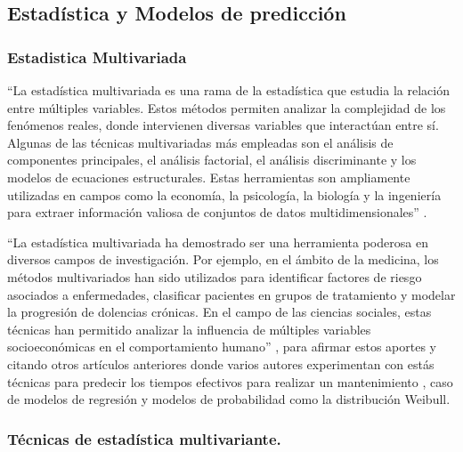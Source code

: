 \documentclass[
  11pt,
  bookmarksnumbered]{article}
\begin{document}
\newpage

\hypertarget{estaduxedstica-y-modelos-de-predicciuxf3n}{%
\subsection{Estadística y Modelos de predicción}\label{estaduxedstica-y-modelos-de-predicciuxf3n}}

\hypertarget{estadistica-multivariada}{%
\subsubsection{Estadistica Multivariada}\label{estadistica-multivariada}}

``La estadística multivariada es una rama de la estadística que estudia la relación entre múltiples variables. Estos métodos permiten analizar la complejidad de los fenómenos reales, donde intervienen diversas variables que interactúan entre sí. Algunas de las técnicas multivariadas más empleadas son el análisis de componentes principales, el análisis factorial, el análisis discriminante y los modelos de ecuaciones estructurales. Estas herramientas son ampliamente utilizadas en campos como la economía, la psicología, la biología y la ingeniería para extraer información valiosa de conjuntos de datos multidimensionales'' \textcite{hair}.

``La estadística multivariada ha demostrado ser una herramienta poderosa en diversos campos de investigación. Por ejemplo, en el ámbito de la medicina, los métodos multivariados han sido utilizados para identificar factores de riesgo asociados a enfermedades, clasificar pacientes en grupos de tratamiento y modelar la progresión de dolencias crónicas. En el campo de las ciencias sociales, estas técnicas han permitido analizar la influencia de múltiples variables socioeconómicas en el comportamiento humano'' \textcite{Tabachnick2013}, para afirmar estos aportes y citando otros artículos anteriores donde varios autores experimentan con estás técnicas para predecir los tiempos efectivos para realizar un mantenimiento , caso de modelos de regresión y modelos de probabilidad como la distribución Weibull.

\hypertarget{tuxe9cnicas-de-estaduxedstica-multivariante.}{%
\subsubsection{Técnicas de estadística multivariante.}\label{tuxe9cnicas-de-estaduxedstica-multivariante.}}
\end{document}
